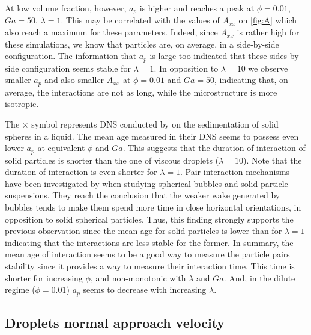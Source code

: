 At low volume fraction, however, $a_p$ is higher and reaches a peak at $\phi=0.01$, $Ga=50$, $\lambda=1$.
This may be correlated with the values of $A_{xx}$ on \ref{fig:A} which also reach a maximum for these parameters. 
Indeed, since $A_{xx}$ is rather high for these simulations, we know that particles are, on average, in a side-by-side configuration.
The information that $a_p$ is large too indicated that these sides-by-side configuration seems stable for $\lambda = 1$. 
In opposition to $\lambda = 10$ we observe smaller $a_p$ and also smaller $A_{xx}$ at $\phi = 0.01$ and $Ga = 50$, indicating that, on average, the interactions are not as long, while the microstructure is more isotropic. 

The $\pmb\times$ symbol represents DNS conducted by \citet{zhang2023evolution} on the sedimentation of solid spheres in a liquid. 
The mean age measured in their DNS seems to possess even lower $a_p$ at equivalent $\phi$ and $Ga$. 
This suggests that the duration of interaction of solid particles is shorter than the one of viscous droplets ($\lambda = 10$).
Note that the duration of interaction is even shorter for $\lambda = 1$. 
Pair interaction mechanisms have been investigated by \citet{yin2008lattice} when studying spherical bubbles and solid particle suspensions.
They reach the conclusion that the weaker wake generated by bubbles tends to make them spend more time in close horizontal orientations, in opposition to solid spherical particles. 
Thus, this finding strongly supports the previous observation since the mean age for solid particles is lower than for $\lambda = 1$ indicating that the interactions are less stable for the former. 
In summary, the mean age of interaction seems to be a good way to measure the particle pairs stability since it provides a way to measure their interaction time. 
This time is shorter for increasing $\phi$, and non-monotonic with $\lambda$ and $Ga$. 
And, in the dilute regime ($\phi = 0.01$) $a_p$ seems to decrease with increasing $\lambda$. 

\subsection{Droplets normal approach velocity}

